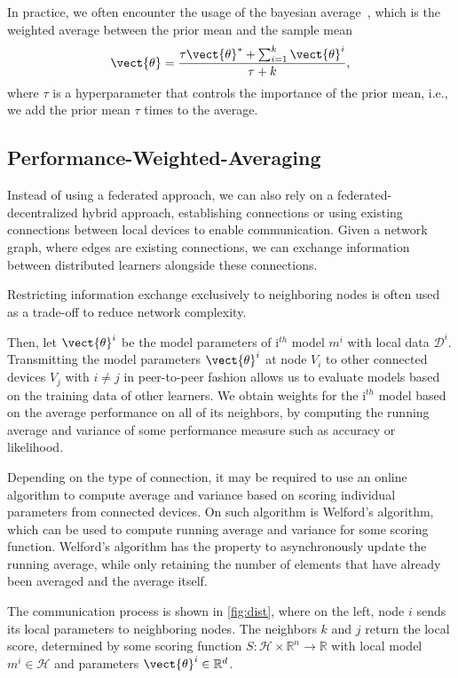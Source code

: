 In practice, we often encounter the usage of the bayesian average~\cite{de2011bayesian}, which is the weighted average between the prior mean and the sample mean
\begin{equation}
    \vect{\theta} = \frac{\tau \vect{\theta}^* + \sum_{i=1}^k \vect{\theta}^i}{\tau + k},
\end{equation}
where $\tau$ is a hyperparameter that controls the importance of the prior mean, i.e., we add the prior mean $\tau$ times to the average. 

\subsection{Performance-Weighted-Averaging}

Instead of using a federated approach, we can also rely on a federated-decentralized hybrid approach, establishing connections or using existing connections between local devices to enable communication.
Given a network graph, where edges are existing connections, we can exchange information between distributed learners alongside these connections.

Restricting information exchange exclusively to neighboring nodes is often used as a trade-off to reduce network complexity.

Then, let $\vect{\theta}^{i}$ be the model parameters of i$^{th}$ model $m^{i}$ with local data $\mathcal{D}^{i}$.
Transmitting the model parameters $\vect{\theta}^{i}$  at node $V_i$  to other connected devices  $V_j$ with $i \neq j$ in peer-to-peer fashion allows us to evaluate models based on the training data of other learners.
We obtain weights for the i$^{th}$ model based on the average performance on all of its neighbors, by computing the running average and variance of some performance measure such as accuracy or likelihood.

Depending on the type of connection, it may be required to use an online algorithm to compute average and variance based on scoring individual parameters from connected devices.
On such algorithm is Welford's algorithm, which can be used to compute running average and variance for some scoring function.
Welford's algorithm has the property to asynchronously update the running average, while only retaining the number of elements that have already been averaged and the average itself.

The communication process is shown in  \autoref{fig:dist}, where on the left, node $i$ sends its local parameters to neighboring nodes. The neighbors $k$ and $j$ return the local score, determined by some scoring function $S: \mathcal{H} \times \mathbb{R}^n \rightarrow \mathbb{R}$ with local model $m^{i} \in \mathcal{H}$ and parameters $\vect{\theta}^{i} \in \mathbb{R}^d$.

